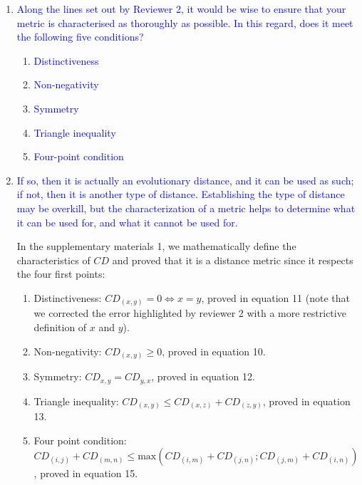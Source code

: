 \documentclass[12pt,letterpaper]{article}
\begin{document}
\begin{enumerate}

\item{\textcolor{blue}{Along the lines set out by Reviewer 2, it would be wise to ensure that your metric is characterised as thoroughly as possible. In this regard, does it meet the following five conditions?}}

\begin{enumerate}
\item{\textcolor{blue}{Distinctiveness}}
\item{\textcolor{blue}{Non-negativity}}
\item{\textcolor{blue}{Symmetry}}
\item{\textcolor{blue}{Triangle inequality}}
\item{\textcolor{blue}{Four-point condition}}
\end{enumerate}

\item{\textcolor{blue}{If so, then it is actually an evolutionary distance, and it can be used as such; if not, then it is another type of distance. Establishing the type of distance may be overkill, but the characterization of a metric helps to determine what it can be used for, and what it cannot be used for.}}

In the supplementary materials 1, we mathematically define the characteristics of $CD$ and proved that it is a distance metric since it respects the four first points:

\begin{enumerate}
\item Distinctiveness: $CD_{(x,y)} = 0 \Leftrightarrow x = y$, proved in equation 11 (note that we corrected the error highlighted by reviewer 2 with a more restrictive definition of $x$ and $y$).
\item Non-negativity: $CD_{(x,y)} \geq 0$, proved in equation 10.
\item Symmetry: $CD_{x,y} = CD_{y,x}$, proved in equation 12.
\item Triangle inequality: $CD_{(x,y)} \leq CD_{(x,z)} + CD_{(z,y)}$, proved in equation 13.
\item Four point condition: $CD_{(i,j)} + CD_{(m,n)} \leq \text{max}{(CD_{(i,m)} + CD_{(j,n)} ; CD_{(j,m)} + CD_{(i,n)} )}$, proved in equation 15.
\end{enumerate}

\end{enumerate}
\end{document}
